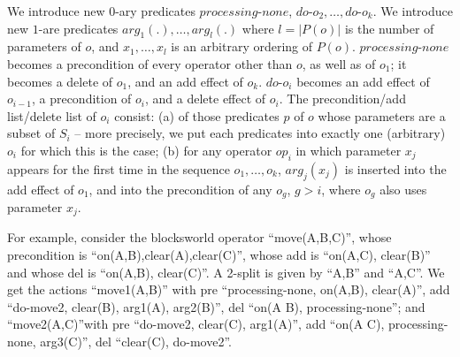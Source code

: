 We introduce new $0$-ary predicates $processing\mbox{-}none$,
$do\mbox{-}o_2, \dots, do\mbox{-}o_k$. We introduce new $1$-are
predicates $arg_1(.), \dots, arg_l(.)$ where $l = |P(o)|$ is the
number of parameters of $o$, and $x_1, \dots, x_l$ is an arbitrary
ordering of $P(o)$. $processing\mbox{-}none$ becomes a precondition of
every operator other than $o$, as well as of $o_1$; it becomes a
delete of $o_1$, and an add effect of $o_k$. $do\mbox{-}o_i$ becomes
an add effect of $o_{i-1}$, a precondition of $o_i$, and a delete
effect of $o_i$. The precondition/add list/delete list of $o_i$
consist: (a) of those predicates $p$ of $o$ whose parameters are a
subset of $S_i$ -- more precisely, we put each predicates into exactly
one (arbitrary) $o_i$ for which this is the case; (b) for any operator
$op_i$ in which parameter $x_j$ appears for the first time in the
sequence $o_1, \dots, o_k$, $arg_j(x_j)$ is inserted into the add
effect of $o_1$, and into the precondition of any $o_g$, $g > i$,
where $o_g$ also uses parameter $x_j$. 


For example, consider the blocksworld operator ``move(A,B,C)'', whose
precondition is ``on(A,B),clear(A),clear(C)'', whose add is ``on(A,C),
clear(B)'' and whose del is ``on(A,B), clear(C)''. A 2-split is given
by ``A,B'' and ``A,C''. We get the actions ``move1(A,B)'' with pre
``processing-none, on(A,B), clear(A)'', add ``do-move2, clear(B),
arg1(A), arg2(B)'', del ``on(A B), processing-none''; and
``move2(A,C)''with pre ``do-move2, clear(C), arg1(A)'', add ``on(A C),
processing-none, arg3(C)'', del ``clear(C), do-move2''.





















